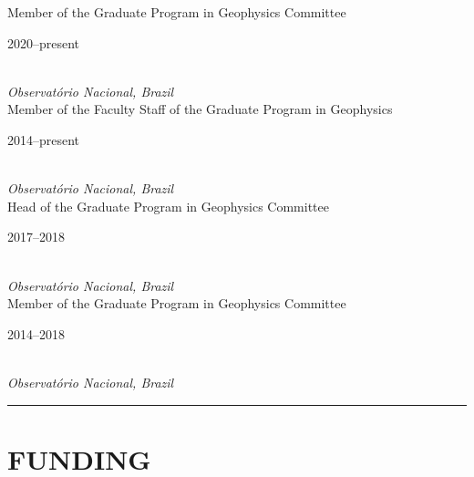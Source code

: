 \documentclass[11pt,a4paper,onecolumn]{article}
\begin{document}
\medskip
	
\noindent Member of the Graduate Program in Geophysics Committee \hfill \parbox{0.1\textwidth}{\raggedright 2020--present} \\
\noindent \textsl{Observat\'{o}rio Nacional, Brazil} \vspace{0.5\baselineskip} \\
\noindent Member of the Faculty Staff of the Graduate Program in Geophysics \hfill \parbox{0.1\textwidth}{\raggedright 2014--present} \\
\noindent \textsl{Observat\'{o}rio Nacional, Brazil} \vspace{0.5\baselineskip} \\
\noindent Head of the Graduate Program in Geophysics Committee \hfill \parbox{0.1\textwidth}{\raggedright 2017--2018} \\
\noindent \textsl{Observat\'{o}rio Nacional, Brazil} \vspace{0.5\baselineskip} \\
\noindent Member of the Graduate Program in Geophysics Committee \hfill \parbox{0.1\textwidth}{\raggedright 2014--2018} \\
\noindent \textsl{Observat\'{o}rio Nacional, Brazil} \vspace{0.5\baselineskip} \\


\bigskip \hrule

\section*{FUNDING}
\end{document}
